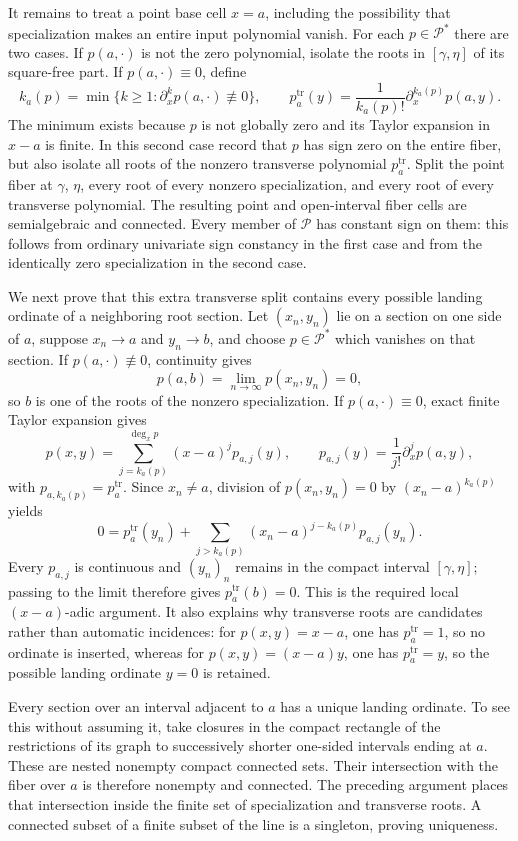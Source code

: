 It remains to treat a point base cell \(x=a\), including the possibility that specialization makes an entire input polynomial vanish.  For each \(p\in\mathscr P^{*}\) there are two cases.  If \(p(a,\cdot)\) is not the zero polynomial, isolate the roots in \([\gamma,\eta]\) of its square-free part.  If \(p(a,\cdot)\equiv0\), define
\[
k_a(p)=\min\bigl\{k\geq 1:\partial_x^k p(a,\cdot)\not\equiv0\bigr\},
\qquad
p_a^{\mathrm{tr}}(y)=\frac{1}{k_a(p)!}\partial_x^{k_a(p)}p(a,y).
\]
The minimum exists because \(p\) is not globally zero and its Taylor expansion in \(x-a\) is finite.  In this second case record that \(p\) has sign zero on the entire fiber, but also isolate all roots of the nonzero transverse polynomial \(p_a^{\mathrm{tr}}\).  Split the point fiber at \(\gamma\), \(\eta\), every root of every nonzero specialization, and every root of every transverse polynomial.  The resulting point and open-interval fiber cells are semialgebraic and connected.  Every member of \(\mathscr P\) has constant sign on them: this follows from ordinary univariate sign constancy in the first case and from the identically zero specialization in the second case.

We next prove that this extra transverse split contains every possible landing ordinate of a neighboring root section.  Let \((x_n,y_n)\) lie on a section on one side of \(a\), suppose \(x_n\to a\) and \(y_n\to b\), and choose \(p\in\mathscr P^{*}\) which vanishes on that section.  If \(p(a,\cdot)\not\equiv0\), continuity gives
\[
p(a,b)=\lim_{n\to\infty}p(x_n,y_n)=0,
\]
so \(b\) is one of the roots of the nonzero specialization.  If \(p(a,\cdot)\equiv0\), exact finite Taylor expansion gives
\[
p(x,y)=\sum_{j=k_a(p)}^{\deg_x p}(x-a)^j p_{a,j}(y),
\qquad
p_{a,j}(y)=\frac{1}{j!}\partial_x^j p(a,y),
\]
with \(p_{a,k_a(p)}=p_a^{\mathrm{tr}}\).  Since \(x_n\neq a\), division of \(p(x_n,y_n)=0\) by \((x_n-a)^{k_a(p)}\) yields
\[
0=p_a^{\mathrm{tr}}(y_n)
  +\sum_{j>k_a(p)}(x_n-a)^{j-k_a(p)}p_{a,j}(y_n).
\]
Every \(p_{a,j}\) is continuous and \((y_n)_n\) remains in the compact interval \([\gamma,\eta]\); passing to the limit therefore gives \(p_a^{\mathrm{tr}}(b)=0\).  This is the required local \((x-a)\)-adic argument.  It also explains why transverse roots are candidates rather than automatic incidences: for \(p(x,y)=x-a\), one has \(p_a^{\mathrm{tr}}=1\), so no ordinate is inserted, whereas for \(p(x,y)=(x-a)y\), one has \(p_a^{\mathrm{tr}}=y\), so the possible landing ordinate \(y=0\) is retained.

Every section over an interval adjacent to \(a\) has a unique landing ordinate.  To see this without assuming it, take closures in the compact rectangle of the restrictions of its graph to successively shorter one-sided intervals ending at \(a\).  These are nested nonempty compact connected sets.  Their intersection with the fiber over \(a\) is therefore nonempty and connected.  The preceding argument places that intersection inside the finite set of specialization and transverse roots.  A connected subset of a finite subset of the line is a singleton, proving uniqueness.


